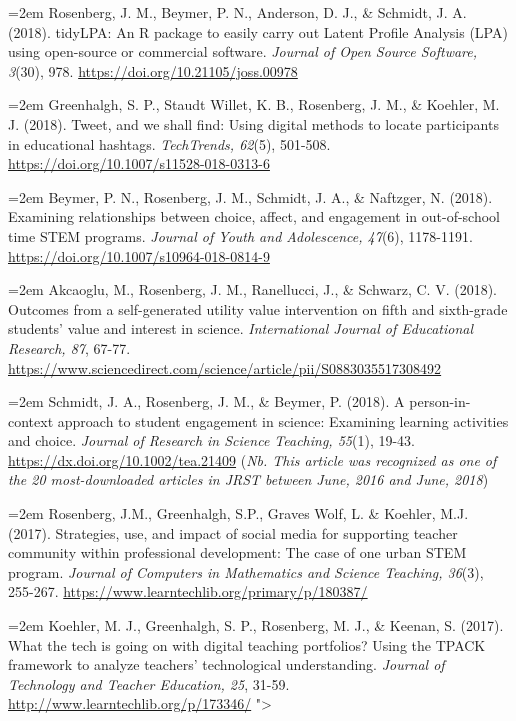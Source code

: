 \documentclass[
  14,
]{article}
\begin{document}
\hangindent=2em Rosenberg, J. M., Beymer, P. N., Anderson, D. J., \&
Schmidt, J. A. (2018). tidyLPA: An R package to easily carry out Latent
Profile Analysis (LPA) using open-source or commercial software.
\emph{Journal of Open Source Software, 3}(30), 978.
\url{https://doi.org/10.21105/joss.00978}

\hangindent=2em Greenhalgh, S. P., Staudt Willet, K. B., Rosenberg, J.
M., \& Koehler, M. J. (2018). Tweet, and we shall find: Using digital
methods to locate participants in educational hashtags.
\emph{TechTrends, 62}(5), 501-508.
\url{https://doi.org/10.1007/s11528-018-0313-6}

\hangindent=2em Beymer, P. N., Rosenberg, J. M., Schmidt, J. A., \&
Naftzger, N. (2018). Examining relationships between choice, affect, and
engagement in out-of-school time STEM programs. \emph{Journal of Youth
and Adolescence, 47}(6), 1178-1191.
\url{https://doi.org/10.1007/s10964-018-0814-9}

\hangindent=2em Akcaoglu, M., Rosenberg, J. M., Ranellucci, J., \&
Schwarz, C. V. (2018). Outcomes from a self-generated utility value
intervention on fifth and sixth-grade students' value and interest in
science. \emph{International Journal of Educational Research, 87},
67-77.
\url{https://www.sciencedirect.com/science/article/pii/S0883035517308492}

\hangindent=2em Schmidt, J. A., Rosenberg, J. M., \& Beymer, P. (2018).
A person-in-context approach to student engagement in science: Examining
learning activities and choice. \emph{Journal of Research in Science
Teaching, 55}(1), 19-43. \url{https://dx.doi.org/10.1002/tea.21409}
(\emph{Nb. This article was recognized as one of the 20 most-downloaded
articles in JRST between June, 2016 and June, 2018})

\hangindent=2em Rosenberg, J.M., Greenhalgh, S.P., Graves Wolf, L. \&
Koehler, M.J. (2017). Strategies, use, and impact of social media for
supporting teacher community within professional development: The case
of one urban STEM program. \emph{Journal of Computers in Mathematics and
Science Teaching, 36}(3), 255-267.
\url{https://www.learntechlib.org/primary/p/180387/}

\hangindent=2em Koehler, M. J., Greenhalgh, S. P., Rosenberg, M. J., \&
Keenan, S. (2017). What the tech is going on with digital teaching
portfolios? Using the TPACK framework to analyze teachers' technological
understanding. \emph{Journal of Technology and Teacher Education, 25},
31-59. \url{http://www.learntechlib.org/p/173346/} "\textgreater{}
\end{document}
